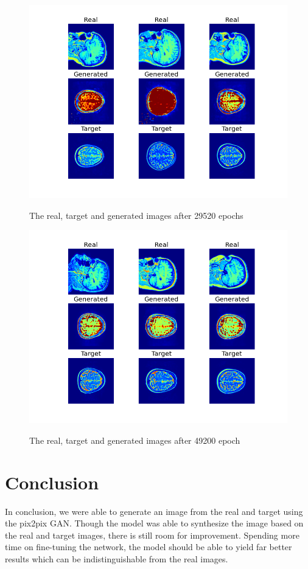 \documentclass[conference]{IEEEtran}
\begin{document}
\begin{figure}[H]
    \centering
    \includegraphics[width=0.95\columnwidth]{plot_029520.png}
    \label{fig:epoch29520}
    \caption{The real, target and generated images after 29520 epochs}
\end{figure}


\begin{figure}[H]
    \centering
    \includegraphics[width=0.95\columnwidth]{plot_049200.png}
    \label{fig:epoch49200}
    \caption{The real, target and generated images after 49200 epoch}
\end{figure}

\section*{Conclusion}

In conclusion, we were able to generate an image from the real and target using the pix2pix GAN. Though the model was able to synthesize the image based on the real and target images, there is still room for improvement. Spending more time on fine-tuning the network, the model should be able to yield far better results which can be indistinguishable from the real images. 

 


\end{document}
